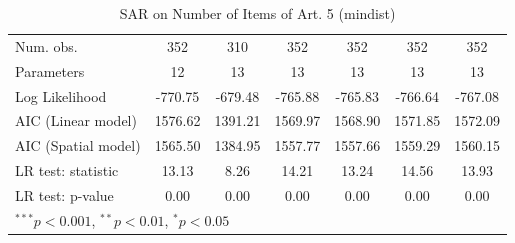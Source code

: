 \begin{table}[!h]
\begin{center}
\begin{tabular}{l c c c c c c }
\midrule
Num. obs.               & 352          & 310         & 352          & 352          & 352          & 352          \\
Parameters              & 12           & 13          & 13           & 13           & 13           & 13           \\
Log Likelihood          & -770.75      & -679.48     & -765.88      & -765.83      & -766.64      & -767.08      \\
AIC (Linear model)      & 1576.62      & 1391.21     & 1569.97      & 1568.90      & 1571.85      & 1572.09      \\
AIC (Spatial model)     & 1565.50      & 1384.95     & 1557.77      & 1557.66      & 1559.29      & 1560.15      \\
LR test: statistic      & 13.13        & 8.26        & 14.21        & 13.24        & 14.56        & 13.93        \\
LR test: p-value        & 0.00         & 0.00        & 0.00         & 0.00         & 0.00         & 0.00         \\
\bottomrule
\multicolumn{7}{l}{\scriptsize{$^{***}p<0.001$, $^{**}p<0.01$, $^*p<0.05$}}
\end{tabular}
\caption{SAR on Number of Items of Art. 5 (mindist)}
\label{table:coefficients}
\end{center}
\end{table}
